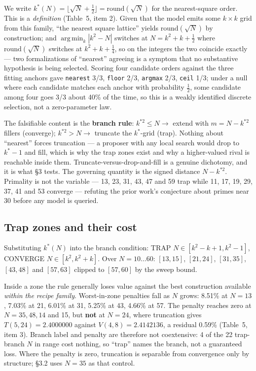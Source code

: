 \documentclass[11pt]{article}
\DeclareMathOperator*{\argmin}{arg\,min}
\begin{document}
We write $k^{*}(N) = \lfloor \sqrt{N} + \tfrac{1}{2} \rfloor = \mathrm{round}(\sqrt{N})$ for the nearest-square order. This is a \textit{definition}
(Table~5, item 2). Given that the model emits some $k \times k$ grid from this family, ``the nearest
square lattice'' yields $\mathrm{round}(\sqrt{N})$ by construction; and $\argmin_k |k^2 - N|$ switches at
$N = k^2 + k + \tfrac{1}{2}$ where $\mathrm{round}(\sqrt{N})$ switches at $k^2 + k + \tfrac{1}{4}$, so on the integers the two coincide
exactly --- two formalizations of ``nearest'' agreeing is a symptom that no substantive hypothesis
is being selected. Scoring four candidate orders against the three fitting anchors gave
\texttt{nearest} 3/3, \texttt{floor} 2/3, \texttt{argmax} 2/3, \texttt{ceil} 1/3; under a null where each candidate matches
each anchor with probability $\tfrac{1}{2}$, some candidate among four goes 3/3 about 40\% of the time, so
this is a weakly identified discrete selection, not a zero-parameter law.

The falsifiable content is the \textbf{branch rule}: $k^{*2} \le N \rightarrow$ extend with $m = N - k^{*2}$ fillers
(converge); $k^{*2} > N \rightarrow$ truncate the $k^{*}$-grid (trap). Nothing about ``nearest'' forces truncation ---
a proposer with any local search would drop to $k^{*}-1$ and fill, which is why the trap zones exist
and why a higher-valued rival is reachable inside them. Truncate-versus-drop-and-fill is a
genuine dichotomy, and it is what \S3 tests. The governing quantity is the signed distance
$N - k^{*2}$. Primality is not the variable --- 13, 23, 31, 43, 47 and 59 trap while 11, 17, 19, 29,
37, 41 and 53 converge --- refuting the prior work's conjecture about primes near 30 before any
model is queried.

\subsection{Trap zones and their cost}

Substituting $k^{*}(N)$ into the branch condition: TRAP $N \in [k^2-k+1, k^2-1]$, CONVERGE
$N \in [k^2, k^2+k]$. Over $N = 10\ldots60$: $[13,15]$, $[21,24]$, $[31,35]$, $[43,48]$ and $[57,63]$ clipped to
$[57,60]$ by the sweep bound.

Inside a zone the rule generally loses value against the best construction available \textit{within the
recipe family}. Worst-in-zone penalties fall as $N$ grows: 8.51\% at $N = 13$, 7.03\% at 21, 6.01\% at
31, 5.25\% at 43, 4.66\% at 57. The penalty reaches zero at $N = 35, 48, 14$ and 15, but \textbf{not} at
$N = 24$, where truncation gives $T(5,24) = 2.4000000$ against $V(4,8) = 2.4142136$, a residual 0.59\%
(Table~5, item 3). Branch label and penalty are therefore not coextensive: 4 of the 22
trap-branch $N$ in range cost nothing, so ``trap'' names the branch, not a guaranteed loss. Where
the penalty is zero, truncation is separable from convergence only by structure; \S3.2 uses
$N = 35$ as that control.
\end{document}
